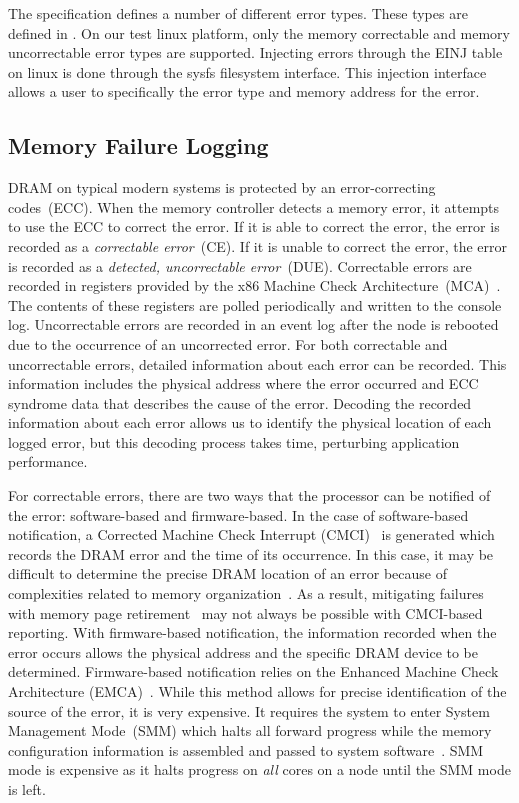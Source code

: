 The specification defines a number of different error types.  These types are
defined in .  On our test linux platform, only the memory
correctable and memory uncorrectable error types are supported.  Injecting
errors through the EINJ table on linux is done through the sysfs filesystem
interface.  This injection interface allows a user to specifically the error type
and memory address for the error.

\subsection{Memory Failure Logging}


DRAM on typical modern systems is protected by an error-correcting
codes~(ECC).  When the memory controller detects a memory error, it attempts to
use the ECC to correct the error.  If it is able to correct the error, the
error is recorded as a \emph{correctable error}~(CE).  If it is unable to
correct the error, the error is recorded as a \emph{detected, uncorrectable
error}~(DUE).  Correctable errors are recorded in registers provided by the x86
Machine Check Architecture~(MCA)~\cite{AMD,IntelGuide}.  The contents of these
registers are polled periodically and written to the console log.
Uncorrectable errors are recorded in an event log after the node is rebooted
due to the occurrence of an uncorrected error.  For both correctable and
uncorrectable errors, detailed information about each error can be recorded.
This information includes the physical address where the error occurred and ECC
syndrome data that describes the cause of the error.  Decoding the recorded
information about each error allows us to identify the physical location of
each logged error, but this decoding process takes time, perturbing application
performance.

For correctable errors, there are two ways that the processor can be notified of
the error: software-based and firmware-based.  In the case of software-based
notification, a Corrected Machine Check Interrupt
(CMCI)~\cite{IntelGuide,Gottscho:2017:Measuring} is generated which records
the DRAM error and the time of its occurrence. In this case, it may be difficult
to determine the precise DRAM location of an error because of complexities related
to memory organization~\cite{Gottscho:2017:Measuring}.  As a result, mitigating
failures with memory page retirement~\cite{Tang:2006:Assessment} may not always
be possible with CMCI-based reporting.  With firmware-based notification, the
information recorded when the error occurs allows the physical address and the
specific DRAM device to be determined.  Firmware-based notification relies on the
Enhanced Machine Check Architecture (EMCA)~\cite{MCAEnhancements}.  While this
method allows for precise identification of the source of the error, it is very
expensive.  It requires the system to enter System Management Mode~(SMM) which halts
all forward progress while the memory configuration information is assembled and
passed to system software~\cite{Gottscho:2017:Measuring}. SMM mode is expensive
as it halts progress on \emph{all} cores on a node until the SMM mode is left.

